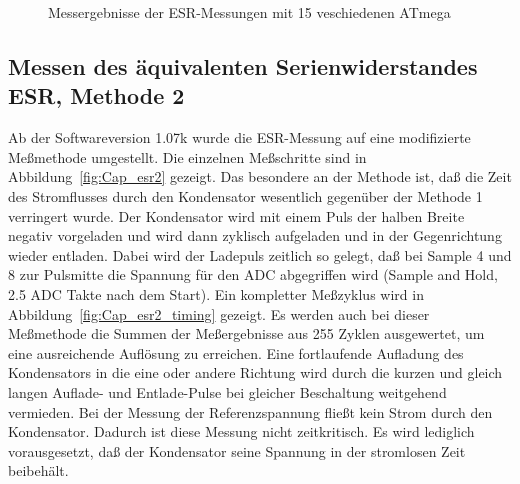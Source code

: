\begin{figure}[H]
\centering

\caption{Messergebnisse der ESR-Messungen mit 15 veschiedenen ATmega}
\label{fig:Cesr}
\end{figure}

\newpage
\subsection{Messen des äquivalenten Serienwiderstandes ESR, Methode 2}
\label{sec:ESR2}
Ab der Softwareversion 1.07k wurde die ESR-Messung auf eine modifizierte Meßmethode umgestellt.
Die einzelnen Meßschritte sind in Abbildung~\ref{fig:Cap_esr2} gezeigt. Das besondere an der Methode
ist, daß die Zeit des Stromflusses durch den Kondensator wesentlich gegenüber der Methode 1 verringert wurde.
Der Kondensator wird mit einem Puls der halben Breite negativ vorgeladen und wird dann zyklisch aufgeladen und in der
Gegenrichtung wieder entladen.
Dabei wird der Ladepuls zeitlich so gelegt, daß bei Sample 4 und 8 zur Pulsmitte
die Spannung für den ADC abgegriffen wird (Sample and Hold, 2.5 ADC Takte nach dem Start).
Ein kompletter Meßzyklus wird in Abbildung~\ref{fig:Cap_esr2_timing} gezeigt.
Es werden auch bei dieser Meßmethode die Summen der Meßergebnisse aus 255 Zyklen ausgewertet,
um eine ausreichende Auflösung zu erreichen.
Eine fortlaufende Aufladung des Kondensators in die eine oder andere Richtung wird durch die kurzen und
gleich langen Auflade- und Entlade-Pulse bei gleicher Beschaltung weitgehend vermieden.
Bei der Messung der Referenzspannung fließt kein Strom durch den Kondensator. Dadurch ist diese Messung
nicht zeitkritisch. Es wird lediglich vorausgesetzt, daß der Kondensator seine Spannung in der
stromlosen Zeit beibehält.

